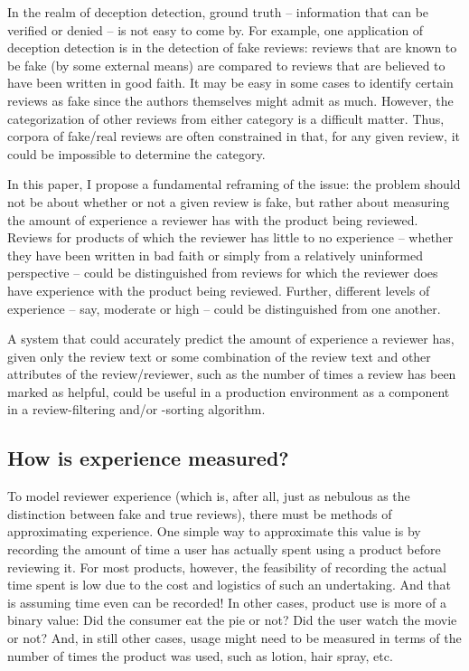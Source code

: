 \documentclass[9pt]{article}
\begin{document}
In the realm of deception detection, ground truth -- information that can be verified or denied -- is not easy to come by. For example, one application of deception detection is in the detection of fake reviews: reviews that are known to be fake (by some external means) are compared to reviews that are believed to have been written in good faith. It may be easy in some cases to identify certain reviews as fake since the authors themselves might admit as much. However, the categorization of other reviews from either category is a difficult matter. Thus, corpora of fake/real reviews are often constrained in that, for any given review, it could be impossible to determine the category.

In this paper, I propose a fundamental reframing of the issue: the problem should not be about whether or not a given review is fake, but rather about measuring the amount of experience a reviewer has with the product being reviewed. Reviews for products of which the reviewer has little to no experience -- whether they have been written in bad faith or simply from a relatively uninformed perspective -- could be distinguished from reviews for which the reviewer does have experience with the product being reviewed. Further, different levels of experience -- say, moderate or high -- could be distinguished from one another.

A system that could accurately predict the amount of experience a reviewer has, given only the review text or some combination of the review text and other attributes of the review/reviewer, such as the number of times a review has been marked as helpful, could be useful in a production environment as a component in a review-filtering and/or -sorting algorithm.

\subsection{How is experience measured?}
\label{ssec:experience}

To model reviewer experience (which is, after all, just as nebulous as the distinction between fake and true reviews), there must be methods of approximating experience. One simple way to approximate this value is by recording the amount of time a user has actually spent using a product before reviewing it. For most products, however, the feasibility of recording the actual time spent is low due to the cost and logistics of such an undertaking. And that is assuming time even can be recorded! In other cases, product use is more of a binary value: Did the consumer eat the pie or not? Did the user watch the movie or not? And, in still other cases, usage might need to be measured in terms of the number of times the product was used, such as lotion, hair spray, etc.
\end{document}
